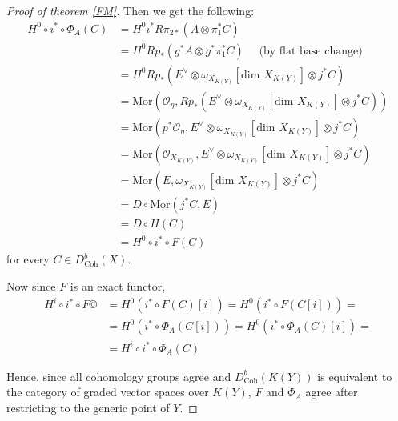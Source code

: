 \documentclass{amsart}
\begin{document}
\begin{proof}[Proof of theorem \ref{FM}]
Then we get the following:
\begin{align*}
H^{0}\circ i^{*}\circ\Phi_{A}(C) &= H^{0} i^{*} R\pi_{2*}(A\otimes \pi_{1}^{*}C)\\
&=H^{0}Rp_{*} (g^{*}A\otimes g^{*} \pi_{1}^{*}C) \quad  \mbox{ (by flat base change)}\\
&= H^{0} Rp_{*} (E^{\vee}\otimes \omega_{X_{K(Y)}}[\mbox{dim }X_{K(Y)}]\otimes j^{*}C) \\ 
&= \mbox{Mor}({\mathcal{O}}_{\eta},Rp_{*}(E^{\vee}\otimes \omega_{X_{K(Y)}}[\mbox{dim }X_{K(Y)}]\otimes j^{*}C)) \\
&= \mbox{Mor}(p^{*}{\mathcal{O}}_{\eta},E^{\vee}\otimes \omega_{X_{K(Y)}}[\mbox{dim }X_{K(Y)}]\otimes j^{*}C) \\
&=\mbox{Mor}({\mathcal{O}}_{X_{K(Y)}},E^{\vee}\otimes \omega_{X_{K(Y)}}[\mbox{dim }X_{K(Y)}]\otimes j^{*}C) \\
&=\mbox{Mor}(E, \omega_{X_{K(Y)}}[\mbox{dim }X_{K(Y)}]\otimes j^{*}C) \\
&= D\circ \mbox{Mor} (j^{*}C,E) \\
&= D\circ H(C) \\
&= H^{0}\circ i^{*}\circ F(C)
\end{align*}
for every $C\in D^{b}_{\mathrm{Coh}}(X)$. 

Now since $F$ is an exact functor,
\begin{align*}
H^{i}\circ i^{*}\circ F© &= H^{0} ( i^{*}\circ F(C) [i])=
H^{0} ( i^{*}\circ F(C[i]) )=\\
&=H^{0} ( i^{*}\circ\Phi_{A}(C[i]) )=
H^{0} ( i^{*}\circ\Phi_{A}(C) [i])=\\
&=H^{i}\circ i^{*}\circ\Phi_{A}(C) 
\end{align*}

Hence, since all cohomology groups agree and $D^{b}_{\mathrm{Coh}}(K(Y))$ is equivalent to the category of graded vector spaces over $K(Y)$, $F$ and $\Phi_{A}$ agree after restricting to the generic point of $Y$.
\end{proof}

{}
 
\end{document}
